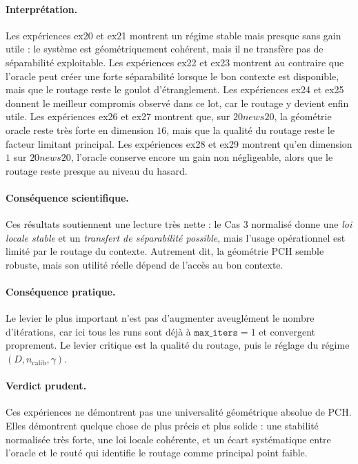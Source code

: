 \documentclass[11pt,a4paper]{article}
\begin{document}
\paragraph{Interprétation.}
Les expériences ex20 et ex21 montrent un régime stable mais presque sans gain utile : le système est géométriquement cohérent, mais il ne transfère pas de séparabilité exploitable. Les expériences ex22 et ex23 montrent au contraire que l'oracle peut créer une forte séparabilité lorsque le bon contexte est disponible, mais que le routage reste le goulot d'étranglement. Les expériences ex24 et ex25 donnent le meilleur compromis observé dans ce lot, car le routage y devient enfin utile. Les expériences ex26 et ex27 montrent que, sur $20news20$, la géométrie oracle reste très forte en dimension $16$, mais que la qualité du routage reste le facteur limitant principal. Les expériences ex28 et ex29 montrent qu'en dimension $1$ sur $20news20$, l'oracle conserve encore un gain non négligeable, alors que le routage reste presque au niveau du hasard.

\paragraph{Conséquence scientifique.}
Ces résultats soutiennent une lecture très nette : le Cas 3 normalisé donne une \emph{loi locale stable} et un \emph{transfert de séparabilité possible}, mais l'usage opérationnel est limité par le routage du contexte. Autrement dit, la géométrie PCH semble robuste, mais son utilité réelle dépend de l'accès au bon contexte.

\paragraph{Conséquence pratique.}
Le levier le plus important n'est pas d'augmenter aveuglément le nombre d'itérations, car ici tous les runs sont déjà à $\texttt{max\_iters}=1$ et convergent proprement. Le levier critique est la qualité du routage, puis le réglage du régime $(D, n_{\mathrm{calib}}, \gamma)$.

\paragraph{Verdict prudent.}
Ces expériences ne démontrent pas une universalité géométrique absolue de PCH. Elles démontrent quelque chose de plus précis et plus solide : une stabilité normalisée très forte, une loi locale cohérente, et un écart systématique entre l'oracle et le routé qui identifie le routage comme principal point faible.
\end{document}
